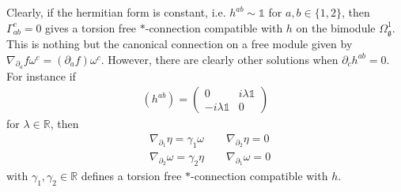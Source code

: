 \documentclass{amsart}
\newcommand{\reals}{\mathbb{R}}
\theoremstyle{definition}
\theoremstyle{remark}
\numberwithin{equation}{section}
\renewcommand{\mid}{\mathds{1}}
\renewcommand{\d}{\partial}
\newcommand{\g}{\mathfrak{g}}
\newcommand{\Omegaoneg}{\Omega^1_{\g}}
\begin{document}
Clearly, if the hermitian form is constant, i.e. $h^{ab}\sim\mid$ for
$a,b\in\{1,2\}$, then $\Gamma^c_{ab}=0$ gives a torsion free
$\ast$-connection compatible with $h$ on the bimodule
$\Omegaoneg$. This is nothing but the canonical connection on a free
module given by $\nabla_{\d_a}f\omega^c=(\d_af)\omega^c$. However,
there are clearly other solutions when $\d_ch^{ab}=0$. For instance if
\begin{align*}
  (h^{ab}) =
  \begin{pmatrix}
    0 & i\lambda\mid \\
    -i\lambda\mid & 0
  \end{pmatrix}                   
\end{align*}
for $\lambda\in\reals$, then
\begin{align*}
  &\nabla_{\d_1}\eta = \gamma_1\omega \qquad \nabla_{\d_2}\eta = 0\\
  &\nabla_{\d_2}\omega = \gamma_2\eta \qquad \nabla_{\d_1}\omega = 0
\end{align*}
with $\gamma_1,\gamma_2\in\reals$ defines a torsion free
$\ast$-connection compatible with $h$.
\end{document}

